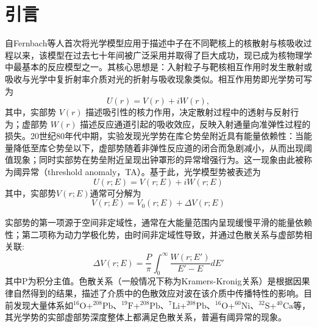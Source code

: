 \documentclass{npr}
\begin{document}
\maketitle

\section*{引言}
自Fernbach等人\cite{fernbach1949scattering}首次将光学模型应用于描述中子在不同靶核上的核散射与核吸收过程以来，该模型在过去七十年间被广泛采用并取得了巨大成功，现已成为核物理学中最基本的反应模型之一。其核心思想是：入射粒子与靶核相互作用时发生散射或吸收与光学中复折射率介质对光的折射与吸收现象类似\cite{feshbach1958optical,hodgson1971nuclear}。相互作用势即光学势可写为
\begin{equation}
U(r) = V(r) + iW(r),
\end{equation}
其中，实部势 $V(r)$ 描述吸引性的核力作用，决定散射过程中的透射与反射行为；虚部势 $W(r)$ 描述反应通道引起的吸收效应，反映入射通量向准弹性过程的损失。20世纪80年代中期，实验发现光学势在库仑势垒附近具有能量依赖性\cite{baeza1984energy,lilley1985evidence}：当能量降低至库仑势垒以下，虚部势随着非弹性反应道的闭合而急剧减小，从而出现阈值现象；同时实部势在势垒附近呈现出钟罩形的异常增强行为。这一现象由此被称为阈异常\cite{nagarajan1985dispersion,mahaux1986causality,satchler1991heavy,brandan1997interaction}（threshold anomaly，TA）。基于此，光学模型势被表述为
\begin{equation}
U(r;E) = V(r;E) + iW(r;E)
\end{equation}
其中，实部势$V(r;E)$通常可分解为
\begin{equation}
V(r;E) = V_0(r;E) + \Delta V(r;E)
\end{equation}

实部势的第一项源于空间非定域性，通常在大能量范围内呈现缓慢平滑的能量依赖性；第二项称为动力学极化势，由时间非定域性导致，并通过色散关系与虚部势相关联:
\begin{equation}
\Delta V(r;E) = \frac{P}{\pi}\int^\infty_0\frac{W(r;E')}{E'-E}dE'
\label{kk}
\end{equation}
其中P为积分主值。色散关系（一般情况下称为Kramers-Kronig关系）是根据因果律自然得到的结果，描述了介质中的色散效应对波在该介质中传播特性的影响。目前发现大量体系如$^{16}\mathrm{O}$+$^{208}\mathrm{Pb}$\cite{nagarajan1985dispersion}、$^{19}\mathrm{F}$+$^{208}\mathrm{Pb}$\cite{lin2001threshold}、$^{7}\mathrm{Li}$+$^{208}\mathrm{Pb}$\cite{keeley1994optical}、$^{16}\mathrm{O}$+$^{60}\mathrm{Ni}$\cite{fulton1985energy}、$^{32}\mathrm{S}$+$^{40}\mathrm{Ca}$\cite{diaz1989threshold}等，其光学势的实部虚部势深度整体上都满足色散关系，普遍有阈异常的现象。
\end{document}
